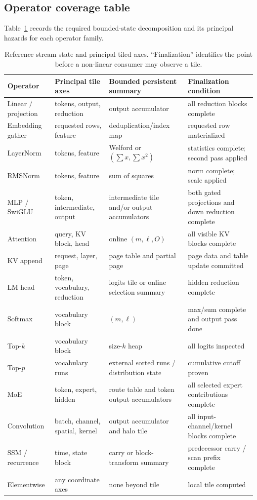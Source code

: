 \subsection{Operator coverage table}
Table~\ref{tab:operators} records the required bounded-state decomposition and its principal hazards for each operator family.

\begin{table}[p]
\centering
\caption{Reference stream state and principal tiled axes. ``Finalization'' identifies the point before a non-linear consumer may observe a tile.}
\label{tab:operators}
\small
\begin{tabularx}{\textwidth}{@{}p{}p{}p{}X@{}}
\toprule
Operator & Principal tile axes & Bounded persistent summary & Finalization condition \\
\midrule
Linear / projection & tokens, output, reduction & output accumulator & all reduction blocks complete \\
Embedding gather & requested rows, feature & deduplication/index map & requested row materialized \\
LayerNorm & tokens, feature & Welford or $(\sum x,\sum x^2)$ & statistics complete; second pass applied \\
RMSNorm & tokens, feature & sum of squares & norm complete; scale applied \\
MLP / SwiGLU & token, intermediate, output & intermediate tile and/or output accumulators & both gated projections and down reduction complete \\
Attention & query, KV block, head & online $(m,\ell,O)$ & all visible KV blocks complete \\
KV append & request, layer, page & page table and partial page & page data and table update committed \\
LM head & token, vocabulary, reduction & logits tile or online selection summary & hidden reduction complete \\
Softmax & vocabulary block & $(m,\ell)$ & max/sum complete and output pass done \\
Top-$k$ & vocabulary block & size-$k$ heap & all logits inspected \\
Top-$p$ & vocabulary runs & external sorted runs / distribution state & cumulative cutoff proven \\
MoE & token, expert, hidden & route table and token output accumulators & all selected expert contributions complete \\
Convolution & batch, channel, spatial, kernel & output accumulator and halo tile & all input-channel/kernel blocks complete \\
SSM / recurrence & time, state block & carry or block-transform summary & predecessor carry / scan prefix complete \\
Elementwise & any coordinate axes & none beyond tile & local tile computed \\
\bottomrule
\end{tabularx}
\end{table}

